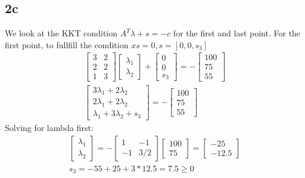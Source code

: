 \subsection{2c}
We look at the KKT condition $A^T \lambda + s = -c$ for the first and last point.
For the first point, to fullfill the condition $xs = 0, s=[0,0,s_3]$
\begin{subequations}
    \begin{align}
        \begin{bmatrix}
            3 & 2\\
            2 & 2 \\ 
            1 & 3
        \end{bmatrix}\begin{bmatrix}
            \lambda_1 \\ \lambda_2
        \end{bmatrix} + \begin{bmatrix}
            0 \\ 0 \\ s_3
        \end{bmatrix}=-\begin{bmatrix}
            100\\75\\55
        \end{bmatrix}\\
        \begin{bmatrix}
            3\lambda_1+2\lambda_2\\ 
            2\lambda_1+2\lambda_2 \\ 
            \lambda_1+3\lambda_2+s_3
        \end{bmatrix}= -\begin{bmatrix}
            100\\75\\55
        \end{bmatrix}
    \end{align}
\end{subequations}
Solving for lambda first:
\begin{subequations}
    \begin{align}
        \begin{bmatrix}
            \lambda_1 \\ \lambda_2
        \end{bmatrix}=-\begin{bmatrix}
            1 & -1 \\ 
            -1 & 3/2
        \end{bmatrix}\begin{bmatrix}
            100\\75
        \end{bmatrix}=\begin{bmatrix}
            -25\\-12.5
        \end{bmatrix} \\ 
        s_3 = -55+25+3*12.5 = 7.5 \geq 0
    \end{align}
\end{subequations}

